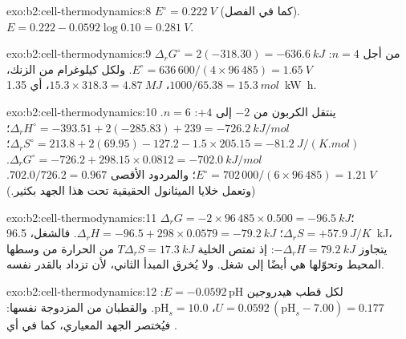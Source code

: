 \begin{solution}{exo:b2:cell-thermodynamics:8}
$E^\circ = \qty{0.222}{V}$ (كما في الفصل). $E = 0.222 - 0.0592\log 0.10 =
\qty{0.281}{V}$.
\end{solution}

\begin{solution}{exo:b2:cell-thermodynamics:9}
$\Delta_r G^\circ = 2(-318.30) = \qty{-636.6}{kJ}$ من أجل $n = 4$: $E^\circ =
636\,600/(4 \times 96\,485) = \qty{1.65}{V}$. ولكل كيلوغرام من الزنك، $1000/65.38 =
\qty{15.3}{mol}$، $15.3 \times 318.3 = \qty{4.87}{MJ}$، أي \qty{1.35}{kW.h}.
\end{solution}

\begin{solution}{exo:b2:cell-thermodynamics:10}
ينتقل الكربون من $-2$ إلى $+4$: $n = 6$. $\Delta_r H^\circ = -393.51 + 2(-285.83) +
239 = \qty{-726.2}{kJ/mol}$؛ $\Delta_r S^\circ = 213.8 + 2(69.95) - 127.2 - 1.5
\times 205.15 = \qty{-81.2}{J/(K.mol)}$؛ $\Delta_r G^\circ = -726.2 + 298.15 \times
0.0812 = \qty{-702.0}{kJ/mol}$. $E^\circ = 702\,000/(6 \times 96\,485) =
\qty{1.21}{V}$؛ والمردود الأقصى $702.0/726.2 = 0.967$. (وتعمل خلايا الميثانول
الحقيقية تحت هذا الجهد بكثير.)
\end{solution}

\begin{solution}{exo:b2:cell-thermodynamics:11}
$\Delta_r G = -2 \times 96\,485 \times 0.500 = \qty{-96.5}{kJ}$؛ $\Delta_r S = +\qty{57.9}{J/K}$؛
$\Delta_r H = -96.5 + 298 \times 0.0579 = \qty{-79.2}{kJ}$. فالشغل، \qty{96.5}{kJ}،
يتجاوز $-\Delta_r H = \qty{79.2}{kJ}$: إذ تمتص الخلية $T\Delta_r S = \qty{17.3}{kJ}$
من الحرارة من وسطها المحيط وتحوّلها هي أيضًا إلى شغل. ولا يُخرق المبدأ
الثاني، لأن  تزداد بالقدر نفسه.
\end{solution}

\begin{solution}{exo:b2:cell-thermodynamics:12}
لكل قطب هيدروجين $E = -0.0592\,\mathrm{pH}$: $U = 0.0592\,(\mathrm{pH}_s -
7.00) = 0.177$، $\mathrm{pH}_s = 10.0$. والقطبان من المزدوجة نفسها:
فيُختصر الجهد المعياري، كما في أي .
\end{solution}

